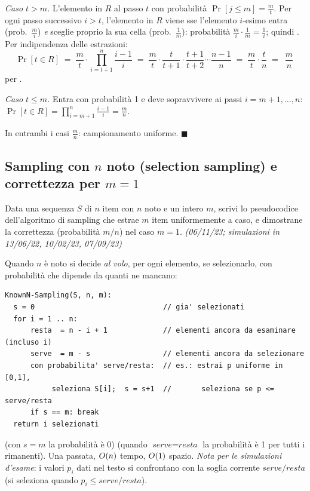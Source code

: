 \emph{Caso $t>m$.} L'elemento  in $R$ al passo $t$ con probabilit\`a
$\Pr[j\le m]=\frac{m}{t}$. Per ogni passo successivo $i>t$, l'elemento in $R$ viene 
sse l'elemento $i$-esimo entra (prob.\ $\frac{m}{i}$) \emph{e} sceglie proprio la sua cella
(prob.\ $\frac{1}{m}$): probabilit\`a $\frac{m}{i}\cdot\frac{1}{m}=\frac{1}{i}$; quindi
. Per indipendenza delle estrazioni:
\[
\Pr[t\in R] \;=\; \frac{m}{t}\cdot\!\!\prod_{i=t+1}^{n}\frac{i-1}{i}
\;=\;\frac{m}{t}\cdot\frac{t}{t+1}\cdot\frac{t+1}{t+2}\cdots\frac{n-1}{n}
\;=\;\frac{m}{t}\cdot\frac{t}{n}\;=\;\boxed{\ \frac{m}{n}\ }
\]
per .

\emph{Caso $t\le m$.} Entra con probabilit\`a 1 e deve sopravvivere ai passi $i=m+1,\dots,n$:
$\Pr[t\in R]=\prod_{i=m+1}^{n}\frac{i-1}{i}=\frac{m}{n}$.

In entrambi i casi $\frac{m}{n}$: campionamento uniforme. $\blacksquare$

\subsection*{ Sampling con $n$ noto (selection sampling) e correttezza per $m=1$}

\begin{domanda}
Data una sequenza $S$ di $n$ item con $n$ noto e un intero $m$, scrivi lo pseudocodice
dell'algoritmo di sampling che estrae $m$ item uniformemente a caso, e dimostrane la correttezza
(probabilit\`a $m/n$) nel caso $m=1$. \emph{(06/11/23; simulazioni in 13/06/22, 10/02/23,
07/09/23)}
\end{domanda}

Quando $n$ \`e noto si decide \emph{al volo}, per ogni elemento, se selezionarlo, con probabilit\`a
che dipende da quanti ne mancano:

\begin{verbatim}
KnownN-Sampling(S, n, m):
  s = 0                              // gia' selezionati
  for i = 1 .. n:
      resta  = n - i + 1             // elementi ancora da esaminare (incluso i)
      serve  = m - s                 // elementi ancora da selezionare
      con probabilita' serve/resta:  // es.: estrai p uniforme in [0,1],
           seleziona S[i];  s = s+1  //       seleziona se p <= serve/resta
      if s == m: break
  return i selezionati
\end{verbatim}

 (con $s=m$ la probabilit\`a \`e 0) 
(quando $\textit{serve}=\textit{resta}$ la probabilit\`a \`e 1 per tutti i rimanenti). Una
passata, $O\!\left(n\right)$ tempo, $O\!\left(1\right)$ spazio. \emph{Nota per le simulazioni d'esame}: i valori $p_i$
dati nel testo si confrontano con la soglia corrente $\textit{serve}/\textit{resta}$
(si seleziona quando $p_i\le\textit{serve}/\textit{resta}$).

